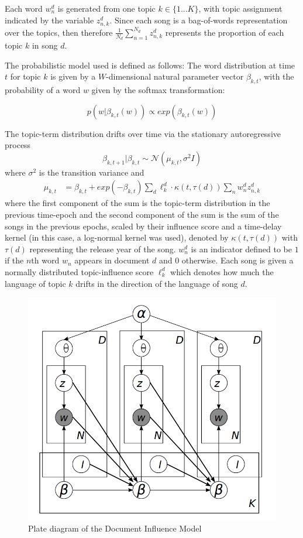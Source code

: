 Each word $w_n^d$ is generated from one topic $k \in \{1...K\}$, with topic assignment indicated by the variable $z_{n,k}^d$. Since each song is a bag-of-words representation over the topics, then therefore $\frac{1}{N_d} \sum_{n=1}^{N_d} z_{n,k}^d$ represents the proportion of each topic $k$ in song $d$.

The probabilistic model used is defined as follows:
The word distribution at time $t$ for topic $k$ is given by a $W$-dimensional natural parameter vector $\beta_{k, t}$, with the probability of a word $w$ given by the softmax transformation:

$$p(w|\beta_{k, t}(w)) \propto exp(\beta_{k, t}(w))$$

The topic-term distribution drifts over time via the stationary autoregressive process
$$\beta_{k, t+1}|\beta_{k, t} \sim \mathcal{N}(\mu_{k,t}, \sigma^2I)$$
where $\sigma^2$ is the transition variance and
\begin{align*}
    \mu_{k,t} &= \beta_{k,t} + exp(-\beta_{k,t})\sum_{d} \ell_k^d \cdot \kappa(t, \tau(d))\sum_n w_n^d z_{n,k}^d
\end{align*}
where the first component of the sum is the topic-term distribution in the previous time-epoch and the second component of the sum is the sum of the songs in the previous epochs, scaled by their influence score and a time-delay kernel (in this case, a log-normal kernel was used), denoted by $\kappa(t, \tau(d))$ with $\tau(d)$ representing the release year of the song. $w_n^d$ is an indicator defined to be $1$ if the $n$th word $w_n$ appears in document $d$ and $0$ otherwise. Each song is given a normally distributed topic-influence score $\ell_k^d$ which denotes how much the language of topic $k$ drifts in the direction of the language of song $d$.

\begin{figure}[H]
\includegraphics[width=\textwidth]{figures/dim_plate.png}
\caption{Plate diagram of the Document Influence Model}
\end{figure}

